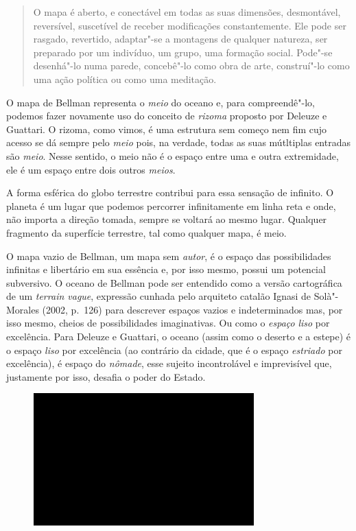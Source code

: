 \begin{quote}
O mapa é aberto, e conectável em todas as suas dimensões, desmontável,
reversível, suscetível de receber modificações constantemente. Ele pode
ser rasgado, revertido, adaptar"-se a montagens de qualquer natureza, ser
preparado por um indivíduo, um grupo, uma formação social. Pode"-se
desenhá"-lo numa parede, concebê"-lo como obra de arte, construí"-lo como
uma ação política ou como uma meditação.
\end{quote}

O mapa de Bellman representa o \emph{meio} do oceano e, para
compreendê"-lo, podemos fazer novamente uso do conceito de \emph{rizoma}
proposto por Deleuze e Guattari. O rizoma, como vimos, é uma estrutura
sem começo nem fim cujo acesso se dá sempre pelo \emph{meio} pois, na
verdade, todas as suas mútltiplas entradas são \emph{meio}. Nesse
sentido, o meio não é o espaço entre uma e outra extremidade, ele é um
espaço entre dois outros \emph{meios}.

A forma esférica do globo terrestre contribui para essa sensação de
infinito. O planeta é um lugar que podemos percorrer infinitamente em
linha reta e onde, não importa a direção tomada, sempre se voltará ao
mesmo lugar. Qualquer fragmento da superfície terrestre, tal como
qualquer mapa, é meio.

O mapa vazio de Bellman, um mapa sem \emph{autor}, é o espaço das
possibilidades infinitas e libertário em sua essência e, por isso mesmo,
possui um potencial subversivo. O oceano de Bellman pode ser entendido
como a versão cartográfica de um \emph{terrain vague}, expressão cunhada
pelo arquiteto catalão Ignasi de Solà"-Morales (2002, p.~126) para descrever espaços vazios e indeterminados mas, por isso
mesmo, cheios de possibilidades imaginativas. Ou como o \emph{espaço}
\emph{liso} por excelência. Para Deleuze e Guattari, o oceano (assim
como o deserto e a estepe) é o espaço \emph{liso} por excelência (ao
contrário da cidade, que é o espaço \emph{estriado} por excelência), é
espaço do \emph{nômade}, esse sujeito incontrolável e imprevisível que,
justamente por isso, desafia o poder do Estado.

\begin{figure}[!ht]

\centering
 \includegraphics[width=85mm]{./imgs/im1.jpg}
\caption{\tiny{}}

\end{figure}



